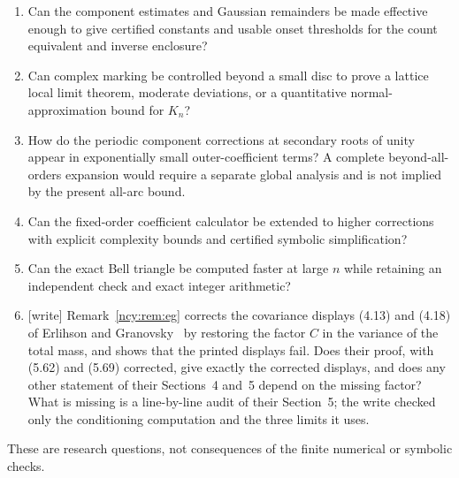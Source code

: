 \documentclass[11pt,letterpaper]{article}
\numberwithin{equation}{section}
\theoremstyle{remark}\newtheorem{remark}[theorem]{Remark}
\theoremstyle{definition}\newtheorem{definition}[theorem]{Definition}\theoremstyle{plain}
\begin{document}
\begin{enumerate}
 \item\label{ncy:q:effective} Can the component estimates and Gaussian remainders be made
 effective enough to give certified constants and usable onset
 thresholds for the count equivalent and inverse enclosure?
 \item\label{ncy:q:local} Can complex marking be controlled beyond a small disc to prove
 a lattice local limit theorem, moderate deviations, or a quantitative
 normal-approximation bound for $K_n$?
 \item\label{ncy:q:periodic} How do the periodic component corrections at secondary roots
 of unity appear in exponentially small outer-coefficient terms?
 A complete beyond-all-orders expansion would require a separate
 global analysis and is not implied by the present all-arc bound.
 \item\label{ncy:q:calculator} Can the fixed-order coefficient calculator be extended to
 higher corrections with explicit complexity bounds and certified
 symbolic simplification?
 \item\label{ncy:q:bell} Can the exact Bell triangle be computed faster at large $n$
 while retaining an independent check and exact integer arithmetic?
 \item\label{ncy:q:eg} \textup{[write]} Remark~\ref{ncy:rem:eg} corrects
 the covariance displays (4.13) and (4.18) of Erlihson and
 Granovsky~\cite{eg2008} by restoring the factor $C$ in the variance of the
 total mass, and shows that the printed displays fail. Does their proof, with
 (5.62) and (5.69) corrected, give exactly the corrected displays, and does
 any other statement of their Sections~4 and~5 depend on the missing factor?
 What is missing is a line-by-line audit of their Section~5; the write
 checked only the conditioning computation and the three limits it uses.
\end{enumerate}
These are research questions, not consequences of the finite numerical
or symbolic checks.
\end{document}
